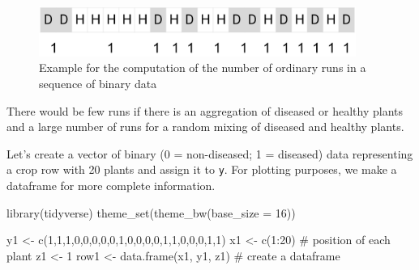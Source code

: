 \documentclass[
  letterpaper,
  DIV=11,
  numbers=noendperiod]{scrreprt}
\newenvironment{Shaded}{\begin{snugshade}}{\end{snugshade}}
\newcommand{\AttributeTok}[1]{\textcolor[rgb]{0.40,0.45,0.13}{#1}}
\newcommand{\CommentTok}[1]{\textcolor[rgb]{0.37,0.37,0.37}{#1}}
\newcommand{\DecValTok}[1]{\textcolor[rgb]{0.68,0.00,0.00}{#1}}
\newcommand{\FunctionTok}[1]{\textcolor[rgb]{0.28,0.35,0.67}{#1}}
\newcommand{\NormalTok}[1]{\textcolor[rgb]{0.00,0.23,0.31}{#1}}
\newcommand{\OtherTok}[1]{\textcolor[rgb]{0.00,0.23,0.31}{#1}}
\newcommand{\SpecialCharTok}[1]{\textcolor[rgb]{0.37,0.37,0.37}{#1}}
\begin{document}
\begin{figure}

{\centering \includegraphics[width=4.07292in,height=\textheight]{imgs/runs.png}

}

\caption{\label{fig-runs1}Example for the computation of the number of
ordinary runs in a sequence of binary data}

\end{figure}

There would be few runs if there is an aggregation of diseased or
healthy plants and a large number of runs for a random mixing of
diseased and healthy plants.

Let's create a vector of binary (0 = non-diseased; 1 = diseased) data
representing a crop row with 20 plants and assign it to \texttt{y}. For
plotting purposes, we make a dataframe for more complete information.

\begin{Shaded}
\begin{Highlighting}[]
\FunctionTok{library}\NormalTok{(tidyverse) }
\FunctionTok{theme\_set}\NormalTok{(}\FunctionTok{theme\_bw}\NormalTok{(}\AttributeTok{base\_size =} \DecValTok{16}\NormalTok{))}
\end{Highlighting}
\end{Shaded}

\begin{Shaded}
\begin{Highlighting}[]
\NormalTok{y1 }\OtherTok{\textless{}{-}} \FunctionTok{c}\NormalTok{(}\DecValTok{1}\NormalTok{,}\DecValTok{1}\NormalTok{,}\DecValTok{1}\NormalTok{,}\DecValTok{0}\NormalTok{,}\DecValTok{0}\NormalTok{,}\DecValTok{0}\NormalTok{,}\DecValTok{0}\NormalTok{,}\DecValTok{0}\NormalTok{,}\DecValTok{1}\NormalTok{,}\DecValTok{0}\NormalTok{,}\DecValTok{0}\NormalTok{,}\DecValTok{0}\NormalTok{,}\DecValTok{0}\NormalTok{,}\DecValTok{1}\NormalTok{,}\DecValTok{1}\NormalTok{,}\DecValTok{0}\NormalTok{,}\DecValTok{0}\NormalTok{,}\DecValTok{0}\NormalTok{,}\DecValTok{1}\NormalTok{,}\DecValTok{1}\NormalTok{)}
\NormalTok{x1 }\OtherTok{\textless{}{-}} \FunctionTok{c}\NormalTok{(}\DecValTok{1}\SpecialCharTok{:}\DecValTok{20}\NormalTok{) }\CommentTok{\# position of each plant}
\NormalTok{z1 }\OtherTok{\textless{}{-}} \DecValTok{1}
\NormalTok{row1 }\OtherTok{\textless{}{-}} \FunctionTok{data.frame}\NormalTok{(x1, y1, z1) }\CommentTok{\# create a dataframe}
\end{Highlighting}
\end{Shaded}
\end{document}
